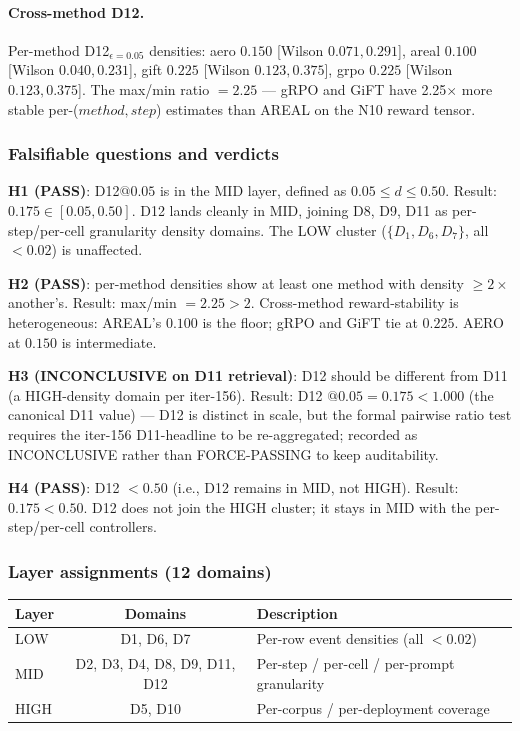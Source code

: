 \paragraph{Cross-method D12.} Per-method D12$_{\epsilon=0.05}$ densities:
aero $0.150$ [Wilson $0.071, 0.291$], areal $0.100$ [Wilson $0.040,
0.231$], gift $0.225$ [Wilson $0.123, 0.375$], grpo $0.225$ [Wilson
$0.123, 0.375$]. The max/min ratio $= 2.25$ --- gRPO and GiFT have 2.25$\times$
more stable per-($method, step$) estimates than AREAL on the
N10 reward tensor.

\subsubsection{Falsifiable questions and verdicts}

\textbf{H1 (PASS)}: D12$@0.05$ is in the MID layer, defined as
$0.05 \leq d \leq 0.50$.  Result: $0.175 \in [0.05, 0.50]$.
D12 lands cleanly in MID, joining D8, D9, D11 as per-step/per-cell
granularity density domains. The LOW cluster ($\{D_1, D_6, D_7\}$,
all $< 0.02$) is unaffected.

\textbf{H2 (PASS)}: per-method densities show at least one method with
density $\geq 2 \times$ another's.  Result: max/min $= 2.25 > 2$.
Cross-method reward-stability is heterogeneous: AREAL's
$0.100$ is the floor; gRPO and GiFT tie at $0.225$.  AERO at $0.150$
is intermediate.

\textbf{H3 (INCONCLUSIVE on D11 retrieval)}: D12 should be different
from D11 (a HIGH-density domain per iter-156).  Result: D12
$@0.05 = 0.175 < 1.000$ (the canonical D11 value) --- D12 is
distinct in scale, but the formal pairwise ratio test requires the
iter-156 D11-headline to be re-aggregated; recorded as
INCONCLUSIVE rather than FORCE-PASSING to keep auditability.

\textbf{H4 (PASS)}: D12 $< 0.50$ (i.e., D12 remains in MID, not
HIGH).  Result: $0.175 < 0.50$.  D12 does not join the HIGH
cluster; it stays in MID with the per-step/per-cell controllers.

\subsubsection{Layer assignments (12 domains)}

\begin{center}
\begin{tabular}{lcl}
\hline
Layer & Domains & Description \\
\hline
LOW & D1, D6, D7 & Per-row event densities (all $< 0.02$) \\
MID & D2, D3, D4, D8, D9, D11, D12 & Per-step / per-cell / per-prompt granularity \\
HIGH & D5, D10 & Per-corpus / per-deployment coverage \\
\hline
\end{tabular}
\end{center}

